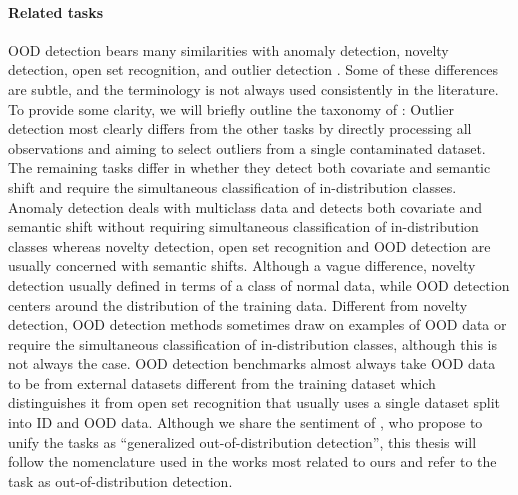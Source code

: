 \paragraph{Related tasks} OOD detection bears many similarities with anomaly detection, novelty detection, open set recognition, and outlier detection \parencite{yang_generalized_2022}. 
Some of these differences are subtle, and the terminology is not always used consistently in the literature. To provide some clarity, we will briefly outline the taxonomy of \textcite{yang_generalized_2022}: 
Outlier detection most clearly differs from the other tasks by directly processing all observations and aiming to select outliers from a single contaminated dataset. 
The remaining tasks differ in whether they detect both covariate and semantic shift and require the simultaneous classification of in-distribution classes. %
Anomaly detection deals with multiclass data and detects both covariate and semantic shift without requiring simultaneous classification of in-distribution classes whereas novelty detection, open set recognition and OOD detection are usually concerned with semantic shifts. 
Although a vague difference, novelty detection usually defined in terms of a class of normal data, while OOD detection centers around the distribution of the training data. Different from novelty detection, OOD detection methods sometimes draw on examples of OOD data or require the simultaneous classification of in-distribution classes, although this is not always the case. 
OOD detection benchmarks almost always take OOD data to be from external datasets different from the training dataset which distinguishes it from open set recognition that usually uses a single dataset split into ID and OOD data. 
Although we share the sentiment of \textcite{yang_generalized_2022}, who propose to unify the tasks as ``generalized out-of-distribution detection'', this thesis will follow the nomenclature used in the works most related to ours and refer to the task as out-of-distribution detection.

